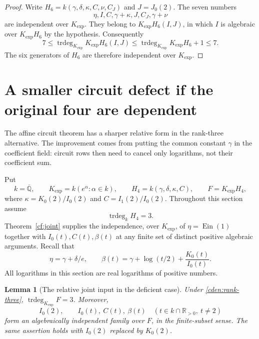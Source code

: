 \documentclass[11pt]{article}
\newtheorem{lemma}[theorem]{Lemma}
\theoremstyle{definition}
\theoremstyle{remark}
\newcommand{\Ein}{\operatorname{Ein}}
\begin{document}
\begin{proof}
Write $H_6=k(\gamma,\delta,\kappa,C,\nu,C_J)$ and $J=J_0(2)$.
The seven numbers
\[
 \eta,I,C,\gamma+\kappa,J,C_J,\gamma+\nu
\]
are independent over $K_{\exp}$.  They belong to
$K_{\exp}H_6(I,J)$, in which $I$ is algebraic over $K_{\exp}H_6$
by the hypothesis.  Consequently
\[
 7\leq\operatorname{trdeg}_{K_{\exp}}K_{\exp}H_6(I,J)
 \leq\operatorname{trdeg}_{K_{\exp}}K_{\exp}H_6+1\leq7.
\]
The six generators of $H_6$ are therefore independent over $K_{\exp}$.
\end{proof}

\section{A smaller circuit defect if the original four are dependent}
\label{cden:section}

The affine circuit theorem has a sharper relative form in the
rank-three alternative. The improvement comes from putting the
common constant $\gamma$ in the coefficient field: circuit rows then
need to cancel only logarithms, not their coefficient sum.

Put
\[
 k=\overline{\mathbb Q},\qquad
 K_{\exp}=k(e^\alpha:\alpha\in k),\qquad
 H_4=k(\gamma,\delta,\kappa,C),\qquad F=K_{\exp}H_4,
\]
where $\kappa=K_0(2)/I_0(2)$ and $C=I_1(2)/I_0(2)$.
Throughout this section assume
\begin{equation}\label{cden:rank-three}
                 \operatorname{trdeg}_k H_4=3.
\end{equation}
Theorem~\ref{cf:joint} supplies the independence, over $K_{\exp}$, of
$\eta=\Ein(1)$ together with
$I_0(t),C(t),\beta(t)$ at any finite set of distinct positive
algebraic arguments. Recall that
\[
 \eta=\gamma+\delta/e,\qquad
 \beta(t)=\gamma+\log(t/2)+\frac{K_0(t)}{I_0(t)}.
\]
All logarithms in this section are real logarithms of positive numbers.

\begin{lemma}[The relative joint input in the deficient case]
\label{cden:relative-input}
Under \eqref{cden:rank-three},
$\operatorname{trdeg}_{K_{\exp}}F=3$. Moreover,
\[
 I_0(2),\qquad I_0(t),\ C(t),\ \beta(t)
 \quad(t\in k\cap\mathbb R_{>0},\ t\ne2)
\]
form an algebraically independent family over $F$, in the
finite-subset sense. The same assertion holds with $I_0(2)$ replaced
by $K_0(2)$.
\end{lemma}
\end{document}
